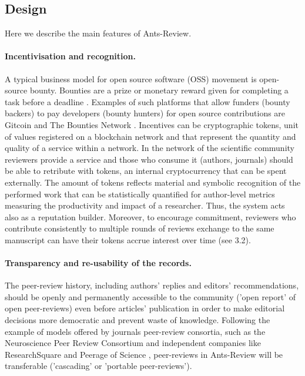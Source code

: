 \documentclass[runningheads]{llncs}
\begin{document}
\subsection{Design}

Here we describe the main features of Ants-Review.
\paragraph{Incentivisation and recognition.} A typical business model for open source software (OSS) movement is open-source bounty. Bounties are a prize or monetary reward given for completing a task before a deadline \cite{BountyGit}. Examples of such platforms that allow funders (bounty backers) to pay developers (bounty hunters) for open source contributions are Gitcoin \cite{Gitcoin} and The Bounties Network \cite{Bounty}. Incentives can be cryptographic tokens, unit of values registered on a blockchain network and that represent the quantity and quality of a service within a network.
\newline In the network of the scientific community reviewers provide a service and those who consume it (authors, journals)  should be able to retribute with tokens, an internal cryptocurrency that can be spent externally. The amount of tokens reflects material and symbolic recognition of the performed work that can be statistically quantified for author-level metrics measuring the productivity and impact of a researcher.
Thus, the system acts also as a reputation builder.
\newline Moreover, to encourage commitment, reviewers who contribute consistently to multiple rounds of reviews exchange to the same manuscript can have their tokens accrue interest over time (see 3.2).

\paragraph{Transparency and re-usability of the records.} The peer-review history, including authors' replies and editors' recommendations, should be openly and permanently accessible to the community ('open report' of open peer-reviews) even before articles' publication in order to  make editorial decisions more democratic and prevent waste of knowledge. Following the example of models offered by journals peer-review consortia, such as the Neuroscience Peer Review Consortium \cite{NeuroPeerCons} and independent companies like ResearchSquare \cite{ResSqu} and Peerage of Science \cite{Peerage}, peer-reviews in Ants-Review will be transferable ('cascading' or 'portable peer-reviews').
\end{document}
